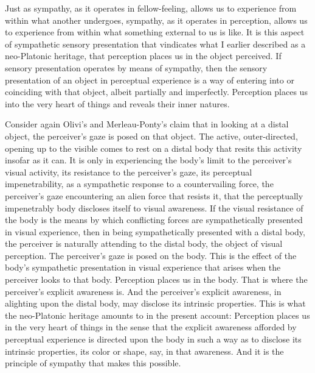 Just as sympathy, as it operates in fellow-feeling, allows us to experience from within what another undergoes, sympathy, as it operates in perception, allows us to experience from within what something external to us is like. It is this aspect of sympathetic sensory presentation that vindicates what I earlier described as a neo-Platonic heritage, that perception places us in the object perceived. If sensory presentation operates by means of sympathy, then the sensory presentation of an object in perceptual experience is a way of entering into or coinciding with that object, albeit partially and imperfectly. Perception places us into the very heart of things and reveals their inner natures.

Consider again Olivi's and Merleau-Ponty's claim that in looking at a distal object, the perceiver's gaze is posed on that object. The active, outer-directed, opening up to the visible comes to rest on a distal body that resits this activity insofar as it can. It is only in experiencing the body's limit to the perceiver's visual activity, its resistance to the perceiver's gaze, its perceptual impenetrability, as a sympathetic response to a countervailing force, the perceiver's gaze encountering an alien force that resists it, that the perceptually impenetrably body discloses itself to visual awareness. If the visual resistance of the body is the means by which conflicting forces are sympathetically presented in visual experience, then in being sympathetically presented with a distal body, the perceiver is naturally attending to the distal body, the object of visual perception. The perceiver's gaze is posed on the body. This is the effect of the body's sympathetic presentation in visual experience that arises when the perceiver looks to that body. Perception places us in the body. That is where the perceiver's explicit awareness is. And the perceiver's explicit awareness, in alighting upon the distal body, may disclose its intrinsic properties. This is what the neo-Platonic heritage amounts to in the present account: Perception places us in the very heart of things in the sense that the explicit awareness afforded by perceptual experience is directed upon the body in such a way as to disclose its intrinsic properties, its color or shape, say, in that awareness. And it is the principle of sympathy that makes this possible.

